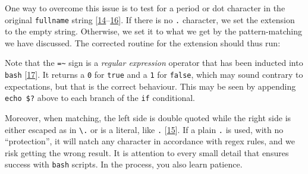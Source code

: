 \documentclass[
  a4paper,
]{article}
\newenvironment{Shaded}{\begin{snugshade}}{\end{snugshade}}
\newcommand{\AttributeTok}[1]{\textcolor[rgb]{0.80,0.80,0.80}{#1}}
\newcommand{\BuiltInTok}[1]{\textcolor[rgb]{0.80,0.80,0.80}{#1}}
\newcommand{\CommentTok}[1]{\textcolor[rgb]{0.50,0.62,0.50}{#1}}
\newcommand{\ControlFlowTok}[1]{\textcolor[rgb]{0.94,0.87,0.69}{#1}}
\newcommand{\DataTypeTok}[1]{\textcolor[rgb]{0.87,0.87,0.75}{#1}}
\newcommand{\KeywordTok}[1]{\textcolor[rgb]{0.94,0.87,0.69}{#1}}
\newcommand{\NormalTok}[1]{\textcolor[rgb]{0.80,0.80,0.80}{#1}}
\newcommand{\OperatorTok}[1]{\textcolor[rgb]{0.94,0.94,0.82}{#1}}
\newcommand{\OtherTok}[1]{\textcolor[rgb]{0.94,0.94,0.56}{#1}}
\newcommand{\PreprocessorTok}[1]{\textcolor[rgb]{1.00,0.81,0.69}{\textbf{#1}}}
\newcommand{\StringTok}[1]{\textcolor[rgb]{0.80,0.58,0.58}{#1}}
\newcommand{\VariableTok}[1]{\textcolor[rgb]{0.80,0.80,0.80}{#1}}
\begin{document}
One way to overcome this issue is to test for a period or dot character
in the original \texttt{fullname} string
{[}\protect\hyperlink{ref-periodtest}{14}--\protect\hyperlink{ref-bashscriptpatmatch}{16}{]}.
If there is no \texttt{.} character, we set the extension to the empty
string. Otherwise, we set it to what we get by the pattern-matching we
have discussed. The corrected routine for the extension should thus run:

\begin{Shaded}
\end{Shaded}

Note that the \texttt{=\textasciitilde{}} sign is a \emph{regular
expression} operator that has been inducted into \texttt{bash}
{[}\protect\hyperlink{ref-equaltilde}{17}{]}. It returns a \texttt{0}
for \texttt{true} and a \texttt{1} for \texttt{false}, which may sound
contrary to expectations, but that is the correct behaviour. This may be
seen by appending \texttt{echo\ \$?} above to each branch of the
\texttt{if} conditional.

Moreover, when matching, the left side is double quoted while the right
side is either escaped as in \texttt{\textbackslash{}.} or is a literal,
like \texttt{\textquotesingle{}.\textquotesingle{}}
{[}\protect\hyperlink{ref-dottest}{15}{]}. If a plain \texttt{.} is
used, with no ``protection'', it will natch any character in accordance
with regex rules, and we risk getting the wrong result. It is attention
to every small detail that ensures success with \texttt{bash} scripts.
In the process, you also learn patience.  \normalfont
\end{document}
